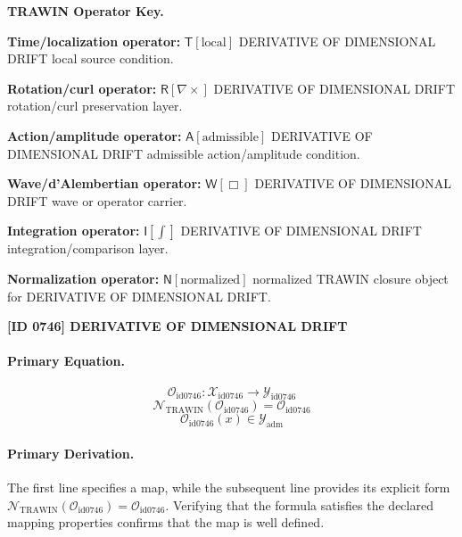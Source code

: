 \par\vspace{0.45\baselineskip}
\noindent\begin{minipage}[t]{\linewidth}
\begingroup
\small
\raggedright
\textbf{TRAWIN Operator Key.}\par
\noindent\textbf{Time/localization operator:} $\mathsf{T}\!\left[\mathrm{local}\right]$ DERIVATIVE OF DIMENSIONAL DRIFT local source condition.\par
\noindent\textbf{Rotation/curl operator:} $\mathsf{R}\!\left[\nabla\times\right]$ DERIVATIVE OF DIMENSIONAL DRIFT rotation/curl preservation layer.\par
\noindent\textbf{Action/amplitude operator:} $\mathsf{A}\!\left[\mathrm{admissible}\right]$ DERIVATIVE OF DIMENSIONAL DRIFT admissible action/amplitude condition.\par
\noindent\textbf{Wave/d'Alembertian operator:} $\mathsf{W}\!\left[\Box\right]$ DERIVATIVE OF DIMENSIONAL DRIFT wave or operator carrier.\par
\noindent\textbf{Integration operator:} $\mathsf{I}\!\left[\int\right]$ DERIVATIVE OF DIMENSIONAL DRIFT integration/comparison layer.\par
\noindent\textbf{Normalization operator:} $\mathsf{N}\!\left[\mathrm{normalized}\right]$ normalized TRAWIN closure object for DERIVATIVE OF DIMENSIONAL DRIFT.\par
\endgroup
\end{minipage}

\clearpage
\noindent\textbf{[ID 0746] DERIVATIVE OF DIMENSIONAL DRIFT}\par
\vspace{0.35em}
\paragraph{Primary Equation.}
\[
\mathcal{O}_{\mathrm{id0746}}:\mathcal{X}_{\mathrm{id0746}}\longrightarrow\mathcal{Y}_{\mathrm{id0746}}
\]
\[
\mathcal{N}_{\mathrm{TRAWIN}}(\mathcal{O}_{\mathrm{id0746}})=\mathcal{O}_{\mathrm{id0746}}
\]
\[
\mathcal{O}_{\mathrm{id0746}}(x)\in\mathcal{Y}_{\mathrm{adm}}
\]

\paragraph{Primary Derivation.}
The first line specifies a map, while the subsequent line provides its explicit form \( \mathcal{N}_{\mathrm{TRAWIN}}(\mathcal{O}_{\mathrm{id0746}})=\mathcal{O}_{\mathrm{id0746}} \). Verifying that the formula satisfies the declared mapping properties confirms that the map is well defined.
